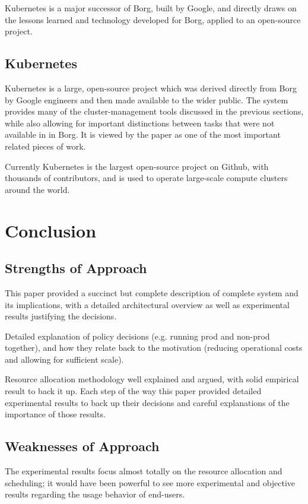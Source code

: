 \documentclass[runningheads,a4paper]{llncs}
\begin{document}
Kubernetes is a major successor of Borg, built by Google, and directly draws on the lessons learned and technology developed for Borg, applied to an open-source project.  

\subsection{Kubernetes}
Kubernetes is a large, open-source project which was derived directly from Borg by Google engineers and then made available to the wider public.  The system provides many of the cluster-management tools discussed in the previous sections, while also allowing for important distinctions between tasks that were not available in in Borg.  It is viewed by the paper as one of the most important related pieces of work.

Currently Kubernetes is the largest open-source project on Github, with thousands of contributors, and is used to operate large-scale compute clusters around the world.

\section{Conclusion}

\subsection{Strengths of Approach}
This paper provided a succinct but complete description of complete system and its implications, with a detailed architectural overview as well as experimental results justifying the decisions. 

Detailed explanation of policy decisions (e.g. running prod and non-prod together), and how they relate back to the motivation (reducing operational costs and allowing for sufficient scale).

Resource allocation methodology well explained and argued, with solid empirical result to back it up.  Each step of the way this paper provided detailed experimental results to back up their decisions and careful explanations of the importance of those results.  

\subsection{Weaknesses of Approach}
The experimental results focus almost totally on the resource allocation and scheduling; it would have been powerful to see more experimental and objective results regarding the usage behavior of end-users.
\end{document}
